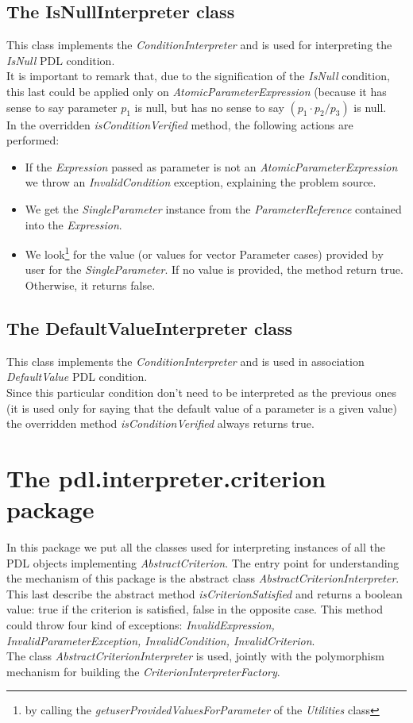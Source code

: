 \documentclass[a4paper,11pt] {ivoa}
\begin{document}
\subsection{The IsNullInterpreter class}
This class  implements the  {\it ConditionInterpreter} and is used for interpreting the {\it IsNull} PDL condition. \\
It is important to remark that, due to the signification of the {\it IsNull} condition, this last could be applied only on {\it AtomicParameterExpression} (because it has sense to say parameter $p_1$ is null, but has no sense to say $(p_1 \cdot p_2 / p_3)$ is null.\\
In the overridden {\it isConditionVerified} method, the following actions are performed:
\begin{itemize}
\item If the {\it Expression} passed as parameter is not an {\it AtomicParameterExpression} we throw an {\it InvalidCondition} exception, explaining the problem source.
\item We get the {\it SingleParameter} instance from the {\it ParameterReference} contained into the {\it Expression}.
\item We look\footnote{by calling the {\it getuserProvidedValuesForParameter} of the {\it Utilities} class} for the value (or values for vector Parameter cases) provided by user for the {\it SingleParameter}. If no value is provided, the method return true. Otherwise, it returns false.
\end{itemize}

\subsection{The DefaultValueInterpreter class}
This class implements the {\it ConditionInterpreter} and is used in association {\it DefaultValue} PDL condition. \\
Since this particular condition don't need to be interpreted as the previous ones (it is used only for saying that the default value of a parameter is a given value) the overridden method  {\it isConditionVerified}  always returns true.

\section{The pdl.interpreter.criterion package}
In this package we put all the classes used for interpreting instances of all the PDL objects implementing {\it AbstractCriterion}.
The entry point for understanding the mechanism of this package is the abstract class {\it AbstractCriterionInterpreter}.
This last describe the abstract method {\it isCriterionSatisfied} and returns a boolean value: true if the criterion is satisfied, false in the opposite case. This method could throw four kind of exceptions: {\it InvalidExpression, InvalidParameterException, InvalidCondition, InvalidCriterion}.\\
The class  {\it AbstractCriterionInterpreter} is used, jointly with the polymorphism mechanism for building the {\it CriterionInterpreterFactory}.
\end{document}
